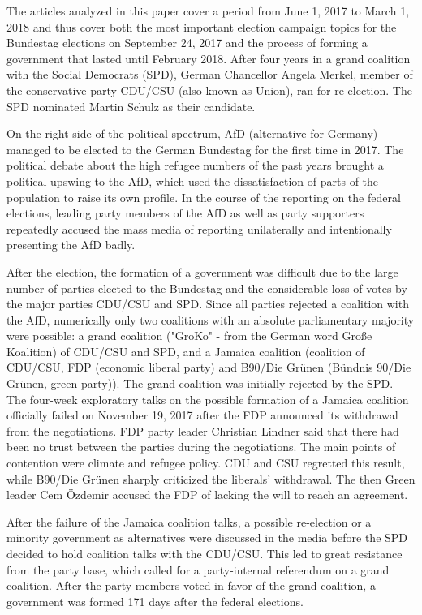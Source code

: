 \documentclass[12pt,a4paper,notitlepage]{article}
\begin{document}
The articles analyzed in this paper cover a period from June 1, 2017 to March 1, 2018 and thus cover both the most important election campaign topics for the Bundestag elections on September 24, 2017 and the process of forming a government that lasted until February 2018. After four years in a grand coalition with the Social Democrats (SPD), German Chancellor Angela Merkel, member of the conservative party CDU/CSU (also known as Union), ran for re-election. The SPD nominated Martin Schulz as their candidate. 

On the right side of the political spectrum, AfD (alternative for Germany) managed to be elected to the German Bundestag for the first time in 2017. The political debate about the high refugee numbers of the past years brought a political upswing to the AfD, which used the dissatisfaction of parts of the population to raise its own profile. In the course of the reporting on the federal elections, leading party members of the AfD as well as party supporters repeatedly accused the mass media of reporting unilaterally and intentionally presenting the AfD badly.

After the election, the formation of a government was difficult due to the large number of parties elected to the Bundestag and the considerable loss of votes by the major parties CDU/CSU and SPD. Since all parties rejected a coalition with the AfD, numerically only two coalitions with an absolute parliamentary majority were possible: a grand coalition ("GroKo" - from the German word Große Koalition) of CDU/CSU and SPD, and a Jamaica coalition (coalition of CDU/CSU, FDP (economic liberal party) and B90/Die Grünen (Bündnis 90/Die Grünen, green party)). The grand coalition was initially rejected by the SPD. The four-week exploratory talks on the possible formation of a Jamaica coalition officially failed on November 19, 2017 after the FDP announced its withdrawal from the negotiations. FDP party leader Christian Lindner said that there had been no trust between the parties during the negotiations. The main points of contention were climate and refugee policy. CDU and CSU regretted this result, while B90/Die Grünen sharply criticized the liberals' withdrawal. The then Green leader Cem Özdemir accused the FDP of lacking the will to reach an agreement.

After the failure of the Jamaica coalition talks, a possible re-election or a minority government as alternatives were discussed in the media before the SPD decided to hold coalition talks with the CDU/CSU. This led to great resistance from the party base, which called for a party-internal referendum on a grand coalition. After the party members voted in favor of the grand coalition, a government was formed 171 days after the federal elections. 
\end{document}
